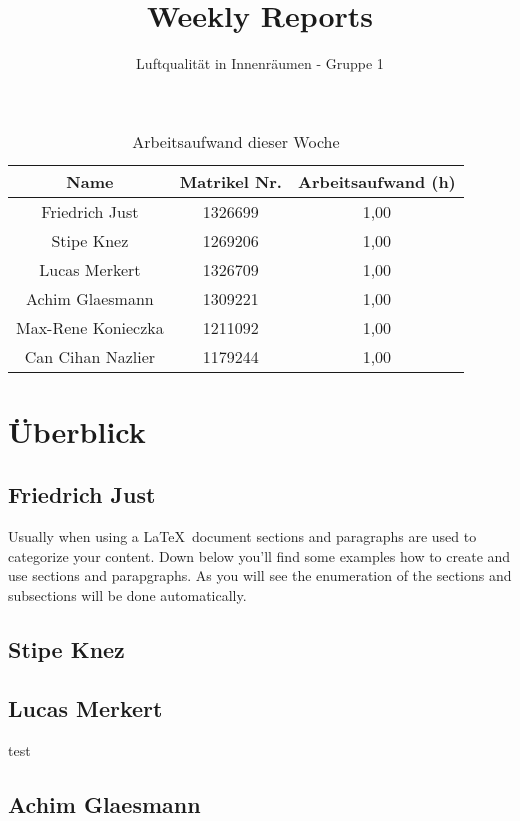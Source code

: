 \documentclass[]{article}
\title{Weekly Reports}
\author{Luftqualität in Innenräumen - Gruppe 1}
\begin{document}
\maketitle

\begin{table}[h!]
	\centering
	\begin{tabular}{|c|c|c|}
		\hline
		{\textbf{Name}}				&		{\textbf{Matrikel Nr.}} & {\textbf{Arbeitsaufwand (h)}} \\
		\hline
		Friedrich Just				&		1326699 				&	1,00	\\
		\hline
		Stipe Knez					&		1269206 				&	1,00	\\
		\hline
		Lucas Merkert				&		1326709					&	1,00	\\
		\hline
		Achim Glaesmann				&		1309221					&	1,00	\\
		\hline
		Max-Rene Konieczka			&		1211092					&	1,00	\\
		\hline
		Can Cihan Nazlier			&		1179244					&	1,00	\\
		\hline
	\end{tabular}
	\caption{Arbeitsaufwand dieser Woche}
	\label{tab:worakload}
\end{table}



\section{Überblick}


\subsection{Friedrich Just}
Usually when using a \LaTeX\ document sections and paragraphs are used to categorize your content. Down below you'll find some examples how to create and use sections and parapgraphs. As you will see the enumeration of the sections and subsections will be done automatically. 

\subsection{Stipe Knez}

\subsection{Lucas Merkert}
test~\cite{influxdb_sql_db} \\

\subsection{Achim Glaesmann}
\end{document}
